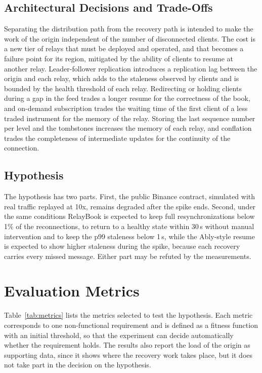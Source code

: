 \documentclass[conference]{IEEEtran}
\begin{document}
\subsection{Architectural Decisions and Trade-Offs}

Separating the distribution path from the recovery path is intended to make the work of the origin independent of the number of disconnected clients. The cost is a new tier of relays that must be deployed and operated, and that becomes a failure point for its region, mitigated by the ability of clients to resume at another relay. Leader-follower replication introduces a replication lag between the origin and each relay, which adds to the staleness observed by clients and is bounded by the health threshold of each relay. Redirecting or holding clients during a gap in the feed trades a longer resume for the correctness of the book, and on-demand subscription trades the waiting time of the first client of a less traded instrument for the memory of the relay. Storing the last sequence number per level and the tombstones increases the memory of each relay, and conflation trades the completeness of intermediate updates for the continuity of the connection.

\subsection{Hypothesis}

The hypothesis has two parts. First, the public Binance contract, simulated with real traffic replayed at 10x, remains degraded after the spike ends. Second, under the same conditions RelayBook is expected to keep full resynchronizations below 1\% of the reconnections, to return to a healthy state within 30\,s without manual intervention and to keep the p99 staleness below 1\,s, while the Ably-style resume is expected to show higher staleness during the spike, because each recovery carries every missed message. Either part may be refuted by the measurements.

\section{Evaluation Metrics}

Table~\ref{tab:metrics} lists the metrics selected to test the hypothesis. Each metric corresponds to one non-functional requirement and is defined as a fitness function with an initial threshold, so that the experiment can decide automatically whether the requirement holds. The results also report the load of the origin as supporting data, since it shows where the recovery work takes place, but it does not take part in the decision on the hypothesis.
\end{document}
